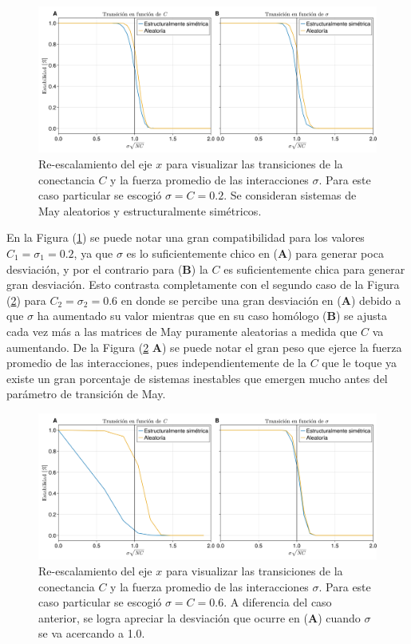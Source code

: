 \begin{figure}[h!]
	\centering
	\includegraphics[scale=0.160]{../Imagenes/Transicionσ√NC02}
	\caption{Re-escalamiento del eje $x$ para visualizar las transiciones de la conectancia $C$ y la fuerza promedio de las interacciones $\sigma$. Para este caso particular se escogió $\sigma=C=0.2$. Se consideran sistemas de May aleatorios y estructuralmente simétricos.}
	\label{fig:Transicionσ√NC02}
\end{figure}

En la Figura (\ref{fig:Transicionσ√NC02}) se puede notar una gran compatibilidad para los valores $C_1=\sigma_1=0.2$, ya que $\sigma$ es lo suficientemente chico en (\textbf{A}) para generar poca desviación, y por el contrario para (\textbf{B}) la $C$ es suficientemente chica para generar gran desviación. Esto contrasta completamente con el segundo caso de la Figura (\ref{fig:Transicionσ√NC06}) para $C_2=\sigma_2=0.6$ en donde se percibe una gran desviación en (\textbf{A}) debido a que $\sigma$ ha aumentado su valor mientras que en su caso homólogo (\textbf{B}) se ajusta cada vez más a las matrices de May puramente aleatorias a medida que $C$ va aumentando. De la Figura (\ref{fig:Transicionσ√NC06} \textbf{A}) se puede notar el gran peso que ejerce la fuerza promedio de las interacciones, pues independientemente de la $C$ que le toque ya existe un gran porcentaje de sistemas inestables que emergen mucho antes del parámetro de transición de May.
\begin{figure}[h!]
	\centering
	\includegraphics[scale=0.160]{../Imagenes/Transicionσ√NC06}
	\caption{Re-escalamiento del eje $x$ para visualizar las transiciones de la conectancia $C$ y la fuerza promedio de las interacciones $\sigma$. Para este caso particular se escogió $\sigma=C=0.6$. A diferencia del  caso anterior, se logra apreciar la desviación que ocurre en (\textbf{A}) cuando $\sigma$ se va acercando a 1.0.}
	\label{fig:Transicionσ√NC06}
\end{figure}




